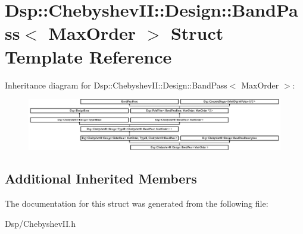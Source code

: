 \hypertarget{structDsp_1_1ChebyshevII_1_1Design_1_1BandPass}{\section{Dsp\-:\-:Chebyshev\-I\-I\-:\-:Design\-:\-:Band\-Pass$<$ Max\-Order $>$ Struct Template Reference}
\label{structDsp_1_1ChebyshevII_1_1Design_1_1BandPass}
}
Inheritance diagram for Dsp\-:\-:Chebyshev\-I\-I\-:\-:Design\-:\-:Band\-Pass$<$ Max\-Order $>$\-:\begin{figure}[H]
\begin{center}
\leavevmode
\includegraphics[height=2.253521cm]{structDsp_1_1ChebyshevII_1_1Design_1_1BandPass}
\end{center}
\end{figure}
\subsection*{Additional Inherited Members}


The documentation for this struct was generated from the following file\-:\begin{DoxyCompactItemize}
\item 
Dsp/Chebyshev\-I\-I.\-h\end{DoxyCompactItemize}
